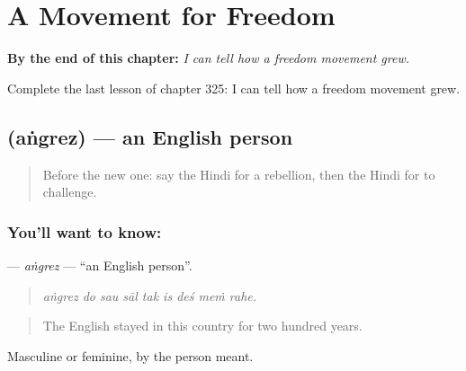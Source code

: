 
\chapter{A Movement for Freedom}
\label{ch:hi-a-movement-for-freedom}

\begin{chapteropening}
\textbf{By the end of this chapter:} \emph{I can tell how a freedom movement grew.}

Complete the last lesson of chapter 325: I can tell how a freedom movement grew.
\end{chapteropening}

\section[\texorpdfstring{\hi{अंग्रेज़} (aṅgrez)}{अंग्रेज़ (aṅgrez)}]{ (aṅgrez) — an English person}

\label{lesson:HI-C325-angrez}



\begin{quote}
Before the new one: say the Hindi for a rebellion, then the Hindi for to challenge.
\end{quote}

\subsection*{You'll want to know: }
\textbf{} — \emph{aṅgrez} — \textquotedblleft{}an English person\textquotedblright{}.

\begin{quote}
        
\end{quote}

\begin{quote}
\emph{aṅgrez do sau sāl tak is deś meṁ rahe.}
\end{quote}

\begin{quote}
The English stayed in this country for two hundred years.
\end{quote}

Masculine or feminine, by the person meant.

